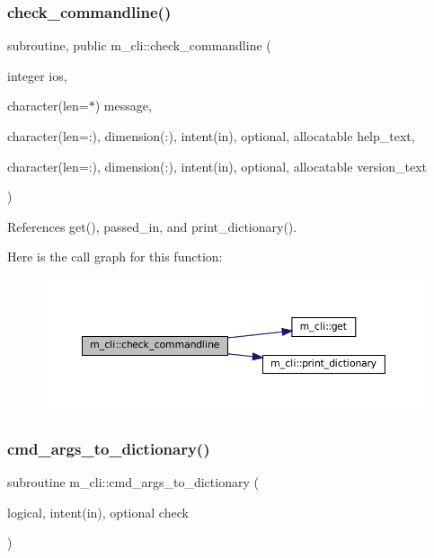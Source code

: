 \subsubsection{\texorpdfstring{check\+\_\+commandline()}{check\_commandline()}}
{\footnotesize\ttfamily subroutine, public m\+\_\+cli\+::check\+\_\+commandline (\begin{DoxyParamCaption}\item[{integer}]{ios,  }\item[{character(len=$\ast$)}]{message,  }\item[{character(len=\+:), dimension(\+:), intent(in), optional, allocatable}]{help\+\_\+text,  }\item[{character(len=\+:), dimension(\+:), intent(in), optional, allocatable}]{version\+\_\+text }\end{DoxyParamCaption})}



References get(), passed\+\_\+in, and print\+\_\+dictionary().

Here is the call graph for this function\+:\nopagebreak
\begin{figure}[H]
\begin{center}
\leavevmode
\includegraphics[width=350pt]{namespacem__cli_a62056f0c153eb63cb0b11a21edb028cd_cgraph}
\end{center}
\end{figure}
\mbox{\label{namespacem__cli_a89a63254465b02048f09541e51974764}} 
\subsubsection{\texorpdfstring{cmd\+\_\+args\+\_\+to\+\_\+dictionary()}{cmd\_args\_to\_dictionary()}}
{\footnotesize\ttfamily subroutine m\+\_\+cli\+::cmd\+\_\+args\+\_\+to\+\_\+dictionary (\begin{DoxyParamCaption}\item[{logical, intent(in), optional}]{check }\end{DoxyParamCaption})\hspace{0.3cm}{\ttfamily [private]}}



